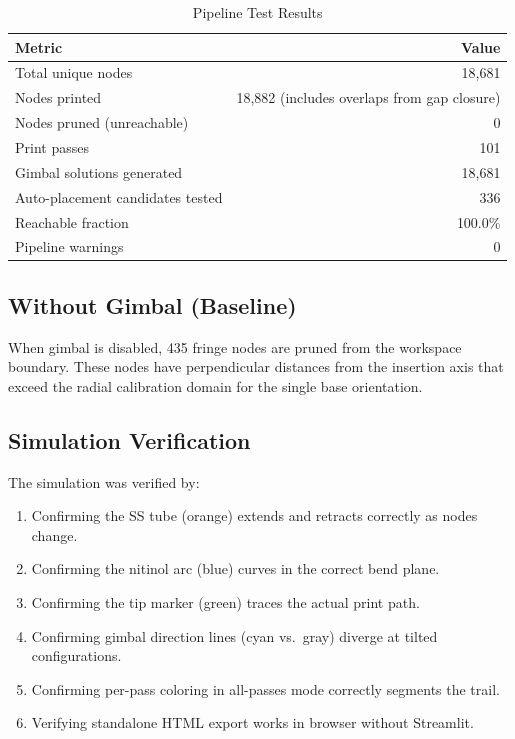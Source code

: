 \documentclass[11pt,a4paper]{article}
\begin{document}
\begin{table}[H]
\centering
\caption{Pipeline Test Results}
\begin{tabular}{lr}
\toprule
\textbf{Metric} & \textbf{Value} \\
\midrule
Total unique nodes & 18,681 \\
Nodes printed & 18,882 (includes overlaps from gap closure) \\
Nodes pruned (unreachable) & 0 \\
Print passes & 101 \\
Gimbal solutions generated & 18,681 \\
Auto-placement candidates tested & 336 \\
Reachable fraction & 100.0\% \\
Pipeline warnings & 0 \\
\bottomrule
\end{tabular}
\end{table}

\subsection{Without Gimbal (Baseline)}

When gimbal is disabled, 435 fringe nodes are pruned from the workspace boundary. These nodes have perpendicular distances from the insertion axis that exceed the radial calibration domain for the single base orientation.

\subsection{Simulation Verification}

The simulation was verified by:
\begin{enumerate}[nosep]
    \item Confirming the SS tube (orange) extends and retracts correctly as nodes change.
    \item Confirming the nitinol arc (blue) curves in the correct bend plane.
    \item Confirming the tip marker (green) traces the actual print path.
    \item Confirming gimbal direction lines (cyan vs.\ gray) diverge at tilted configurations.
    \item Confirming per-pass coloring in all-passes mode correctly segments the trail.
    \item Verifying standalone HTML export works in browser without Streamlit.
\end{enumerate}
\end{document}

